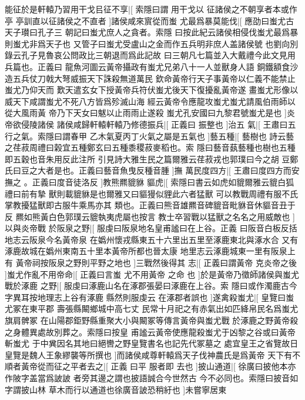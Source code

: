 %
能征於是軒轅乃習用干戈㠯征不享|[%
索隱曰謂%
用干戈以%
%
征諸侯之不朝享者本或作亭%
亭訓直以征諸侯之不直者%
]諸侯咸來賔從而蚩%
%
尤最爲暴莫能伐|[%
應劭曰蚩尤古天子瓉曰孔子三%
朝記曰蚩尤庶人之貪者。索隱%
%
曰按此紀云諸侯相侵伐蚩尤最爲暴則蚩尤非爲天子也%
又管子曰蚩尤受盧山之金而作五兵明非庶人盖諸侯號%
%
也劉向別錄云孔子見魯哀公問政比三朝退而爲此記故%
曰三朝凡七篇並入大戴禮今此文見用兵篇也。正義曰%
%
龍魚河圖云黃帝攝政有蚩尤兄弟八十一人並獸身人語%
銅鐵額食沙造五兵仗刀戟大弩威振天下誅殺無道萬民%
%
欽命黃帝行天子事黃帝以仁義不能禁止蚩尤乃仰天而%
歎天遣玄女下授黃帝兵符伏蚩尤後天下復擾亂黃帝遂%
%
畫蚩尤形像以威天下咸謂蚩尤不死八方皆爲殄滅山海%
經云黃帝令應龍攻蚩尤蚩尤請風伯雨師以從大風雨黃%
%
帝乃下天女曰魃以止雨雨止遂殺%
蚩尤孔安國曰九黎君號蚩尤是也%
]炎帝欲侵陵諸侯%
%
諸侯咸歸軒轅軒轅乃修德振兵|[%
正義曰%
振整也%
]治五%
%
氣|[%
王肅曰五行之氣。索隱曰謂春甲%
乙木氣夏丙丁火氣之屬是五氣也%
]藝五種|[%
藝樹也%
詩云藝%
%
之荏菽周禮曰榖宜五種鄭玄曰五種黍稷菽麥稻也。索%
隱曰藝音蓺藝種也樹也五種即五穀也音朱用反此注所%
%
引見詩大雅生民之篇爾雅云荏菽戎也郭璞曰今之胡%
豆鄭氏曰豆之大者是也。正義曰藝音魚曳反種音腫%
]撫%
%
萬民度四方|[%
王肅曰度四方而安撫之%
。正義曰度音徒洛反%
]教熊羆貔貅%
%
貙虎|[%
索隱曰書云如虎如貔爾雅云貔白狐禮曰前有摯%
獸則載貔貅是也爾雅又曰貙獌似貍此六者猛獸%
%
可以教戰周禮有服不氏掌教擾猛獸即古服牛乘馬亦其%
類也。正義曰熊音雄羆音碑貔音毗貅音休貙音丑于反%
%
羆如熊黃白色郭璞云貔執夷虎屬也按言%
教士卒習戰以猛獸之名名之用威敵也%
]以與炎帝戰%
%
於阪泉之野|[%
服虔曰阪泉地名皇甫謐曰在上谷。正義%
曰阪音白板反括地志云阪泉今名黃帝泉%
%
在嬀州懷戎縣東五十六里出五里至涿鹿東北與涿水合%
又有涿鹿故城在嬀州東南五十里本黃帝所都也晉太康%
%
地里志云涿鹿城東一里有阪泉上有%
黃帝祠按阪泉之野則平野之地也%
]三戰然後得其%
%
志|[%
正義曰謂黃帝%
克炎帝之後%
]蚩尤作亂不用帝命|[%
正義曰言蚩%
尤不用黃帝%
%
之命%
也%
]於是黃帝乃徵師諸侯與蚩尤戰於涿鹿%
%
之野|[%
服虔曰涿鹿山名在涿郡張晏曰涿鹿在上谷。索%
隱曰或作濁鹿古今字異耳按地理志上谷有涿鹿%
%
縣然則服虔云%
在涿郡者誤也%
]遂禽殺蚩尤|[%
皇覽曰蚩尤冢在東平郡%
壽張縣闞鄉城中高七丈%
%
民常十月祀之有赤氣出如匹絳帛民名爲蚩尤旗肩髀冢%
在山陽郡鉅野縣重聚大小與闞冢等傳言黃帝與蚩尤戰%
%
於涿鹿之野黃帝殺之身體異處故別葬之。索隱曰按皇%
甫謐云黃帝使應龍殺蚩尤于凶黎之谷或曰黃帝斬蚩尤%
%
于中兾因名其地曰絕轡之野皇覽書名也記先代冢墓之%
處宜皇王之省覽故日皇覽是魏人王象繆襲等所撰也%
%
]而諸侯咸尊軒轅爲天子伐神農氏是爲黃帝%
%
天下有不順者黃帝從而征之平者去之|[%
正義%
曰平%
%
服者即%
去也%
]披山通道|[%
徐廣曰披他本亦作陂字盖當爲詖詖%
者旁其邊之謂也披語誠合今世然古%
%
今不必同也。索隱曰披音如字謂披山林%
草木而行以通道也徐廣音詖恐稍紆也%
]未嘗寧居東%
